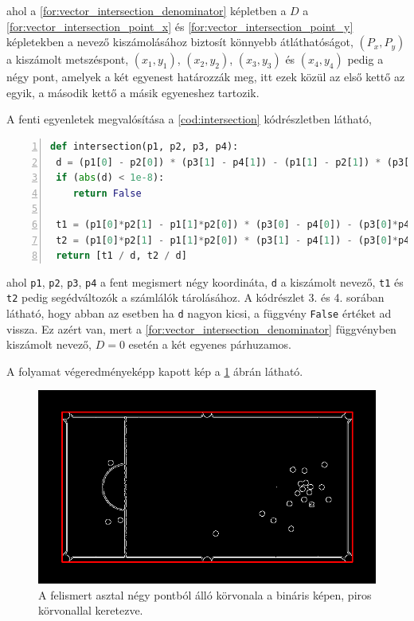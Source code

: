 \par ahol a \ref{for:vector_intersection_denominator} képletben a $D$ a \ref{for:vector_intersection_point_x} és \ref{for:vector_intersection_point_y} képletekben a nevező kiszámolásához biztosít könnyebb átláthatóságot, $(P_x, P_y)$ a kiszámolt metszéspont, $(x_1, y_1)$, $(x_2, y_2)$, $(x_3, y_3)$ és $(x_4, y_4)$ pedig a négy pont, amelyek a két egyenest határozzák meg, itt ezek közül az első kettő az egyik, a második kettő a másik egyeneshez tartozik.
\par A fenti egyenletek megvalósítása a \ref{cod:intersection} kódrészletben látható,

\vspace{2mm}
\hspace{-10mm}
\begin{minipage}{\linewidth}
\begin{lstlisting}[language=Python, numbers=left, caption={Metszéspont kereső algoritmus.}, label={cod:intersection}]
def intersection(p1, p2, p3, p4):
 d = (p1[0] - p2[0]) * (p3[1] - p4[1]) - (p1[1] - p2[1]) * (p3[0] - p4[0])
 if (abs(d) < 1e-8):
    return False

 t1 = (p1[0]*p2[1] - p1[1]*p2[0]) * (p3[0] - p4[0]) - (p3[0]*p4[1] - p3[1]*p4[0]) * (p1[0] - p2[0])
 t2 = (p1[0]*p2[1] - p1[1]*p2[0]) * (p3[1] - p4[1]) - (p3[0]*p4[1] - p3[1]*p4[0]) * (p1[1] - p2[1])
 return [t1 / d, t2 / d]
\end{lstlisting}
\end{minipage}

\par ahol \lstinline{p1}, \lstinline{p2}, \lstinline{p3}, \lstinline{p4} a fent megismert négy koordináta, \lstinline{d} a kiszámolt nevező, \lstinline{t1} és \lstinline{t2} pedig segédváltozók a számlálók tárolásához. A kódrészlet 3. és 4. sorában látható, hogy abban az esetben ha \lstinline{d} nagyon kicsi, a függvény \lstinline{False} értéket ad vissza. Ez azért van, mert a \ref{for:vector_intersection_denominator} függvényben kiszámolt nevező, $D = 0$ esetén a két egyenes párhuzamos.
\par A folyamat végeredményeképp kapott kép a \ref{fig:bemeneti_kep_quad} ábrán látható.

\begin{figure}[!ht]
    \centering
    \includegraphics[width=140mm, keepaspectratio]{figures/input_screen_quad.png}
    \caption{A felismert asztal négy pontból álló körvonala a bináris képen, piros körvonallal keretezve.}
    \label{fig:bemeneti_kep_quad}
\end{figure}

